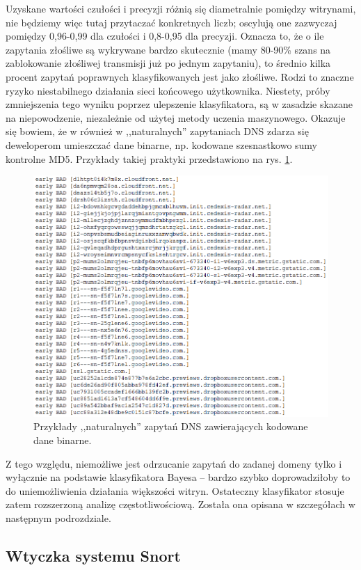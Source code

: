 \documentclass{eiti-raport}
\begin{document}
Uzyskane wartości czułości i precyzji różnią się diametralnie pomiędzy witrynami, nie będziemy więc tutaj przytaczać konkretnych liczb; oscylują one zazwyczaj pomiędzy 0,96-0,99 dla czułości i 0,8-0,95 dla precyzji. Oznacza to, że o ile zapytania złośliwe są wykrywane bardzo skutecznie (mamy 80-90\% szans na zablokowanie złośliwej transmisji już po jednym zapytaniu), to średnio kilka procent zapytań poprawnych klasyfikowanych jest jako złośliwe. Rodzi to znaczne ryzyko niestabilnego działania sieci końcowego użytkownika. Niestety, próby zmniejszenia tego wyniku poprzez ulepszenie klasyfikatora, są w zasadzie skazane na niepowodzenie, niezależnie od użytej metody uczenia maszynowego. Okazuje się bowiem, że w również w ,,naturalnych'' zapytaniach DNS zdarza się deweloperom umieszczać dane binarne, np. kodowane szesnastkowo sumy kontrolne MD5. Przykłady takiej praktyki przedstawiono na rys. \ref{fig:badlog}. 
\begin{figure}[!h] \centering
	\includegraphics[width=0.95\linewidth]{img/badlog.PNG}
	\caption{Przykłady ,,naturalnych'' zapytań DNS zawierających kodowane dane binarne.} \label{fig:badlog}
\end{figure}

Z tego względu, niemożliwe jest odrzucanie zapytań do zadanej domeny tylko i wyłącznie na podstawie klasyfikatora Bayesa -- bardzo szybko doprowadziłoby to do uniemożliwienia działania większości witryn. Ostateczny klasyfikator stosuje zatem rozszerzoną analizę częstotliwościową. Została ona opisana w szczegółach w następnym podrozdziale. 

\subsection{Wtyczka systemu Snort} \label{sec:plugin}
\end{document}
